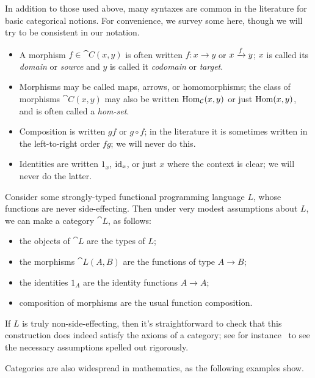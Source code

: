 \begin{ntn}
  In addition to those used above, many syntaxes are common in the literature for basic
  categorical notions. For convenience, we survey some here, though we will try
  to be consistent in our notation.\begin{itemize}
    \item A morphism $f\in\cat{C}(x, y)$ is often written $f\colon x\to y$ or $x\xrightarrow{f} y$; $x$ is
      called its \emph{domain} or \emph{source} and $y$ is called it \emph{codomain}
      or \emph{target}.
    \item Morphisms may be called maps, arrows, or homomorphisms; the class of morphisms $\cat{C}(x, y)$ may also be written
      $\operatorname{Hom}_{{\mathcal{C}}}(x, y)$ or just $\operatorname{Hom}(x, y)$, and is often called a \emph{hom-set}.
    \item Composition is written $gf$ or $g\circ f$; in the literature it is
      sometimes written in the left-to-right order $fg$; we will never do this.
    \item Identities are written $1_x$, $\operatorname{id}_x$, or just $x$ where the context
      is clear; we will never do the latter.
    \end{itemize}
\end{ntn}

\begin{ex}\label{ex:functional programming}
  Consider some strongly-typed functional programming language $L$, whose functions
  are never side-effecting. Then under very modest assumptions about $L$, we
  can make a category $\cat{L}$, as follows:
  \begin{itemize}
    \item the objects of $\cat{L}$ are the types of $L$;
    \item the morphisms $\cat{L}(A, B)$ are the functions of type $A\to B$;
    \item the identities $1_A$ are the identity functions $A\to A$;
    \item composition of morphisms are the usual function composition.
  \end{itemize}

  If $L$ is truly non-side-effecting, then it's straightforward to check
  that this construction does indeed satisfy the axioms of a category; see for
  instance~\cite[subsection 2.2]{barr-wells-1990} to see the necessary assumptions
  spelled out rigorously.
\end{ex}

\noindent
Categories are also widespread in mathematics, as the following examples show.

